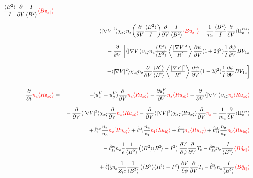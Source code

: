 \documentclass[11pt]{article}
\def\r#1{{\rm#1}}
\def\ave#1{\left\langle#1\right\rangle}
\def\aves#1{\langle#1\rangle}
\def\dd#1#2{\frac{\partial #1}{\partial #2}}
\def\para{\parallel}
\def\ddV{\frac{\partial}{\partial V}}
\def\ddt{\frac{\partial}{\partial t}}
\def\mz{m_\r{z}}
\def\nee{n_\r{e}}
\def\ni{n_\r{i}}
\def\nz{n_\r{z}}
\def\nb{n_\r{b}}
\def\Te{T_\r{e}}
\def\Ti{T_\r{i}}
\def\Zi{Z_\r{i}}
\def\uzt#1{u_{\r{#1}\zeta}}
\def\upara#1{u_{\r{#1}\para}}
\def\qhatpara#1{\hat{q}_{\r{#1}\para}}
\def\uV#1{u_\r{#1}^V}
\def\ugV{u_{g}^V}
\def\chis#1{\chi_\r{#1}}
\def\bri{\aves{B^2}\aves{R^2} - I^2}
\def\red#1{\textcolor{red}{#1}}
\begin{document}
\begin{eqnarray}
  \frac{\aves{B^2}}{I} \ddV \frac{I}{\aves{B^2}} \red{\aves{B \upara{z}}}
\nonumber\\[3mm]&&{}
%
  - \aves{|\nabla V|^2} \chis{z\zeta} \nz \biggl( \ddV
  \frac{\aves{B^2}}{I} \biggr) \ddV \frac{I}{\aves{B^2}} \red{\aves{B \upara{z}}}
%
  - \frac{1}{\mz} \frac{\aves{B^2}}{I} \ddV \aves{\Pi_\r{z}^\r{res}}
\nonumber\\[3mm]&&{}
%
  - \ddV
    \left[  \aves{|\nabla V|} v_{\r{z}\zeta} \nz
            \frac{\aves{R^2}}{\aves{B^2}}\ave{\frac{|\nabla V|^2}{R^2}}\dd{\psi}{V}(1+2\hat{q}^2)
	    \frac{1}{I} \dd{\psi}{V} BV_{1\r{z}} \right.
\nonumber\\[3mm]&&{}
    \left.- \aves{|\nabla V|^2} \chis{z\zeta} \nz
          \ddV \frac{\aves{R^2}}{\aves{B^2}}\ave{\frac{|\nabla V|^2}{R^2}}\dd{\psi}{V}(1+2\hat{q}^2)
	  \frac{1}{I} \dd{\psi}{V} BV_{1\r{z}}\right]
\\[5mm]
  \ddt \red{\nz \aves{R \uzt{z}}} &=&
%
  - (\uV{z} - \ugV) \ddV \red{\nz \aves{R \uzt{z}}}
%
  - \dd{\uV{z}}{V} \red{\nz \aves{R \uzt{z}}}
%
  - \ddV \aves{|\nabla V|} v_{\r{z}\zeta} \red{\nz \aves{R \uzt{z}}}
\nonumber\\[3mm]&&{}
  + \ddV \aves{|\nabla V|^2} \chis{z\zeta} \ddV \red{\nz \aves{R \uzt{z}}}
  - \ddV \aves{|\nabla V|^2} \chis{z\zeta} \aves{R \uzt{z}}\ddV \red{\nz} 
  - \frac{1}{\mz} \ddV \aves{\Pi_\r{z}^\r{res}}
\nonumber\\[2.5mm]&&{}
%
  + \hat{\ell}_{11}^\r{ze} \frac{\nz}{\nee} \red{\nee \aves{R \uzt{e}}}
  + \hat{\ell}_{11}^\r{zi} \frac{\nz}{\ni}  \red{\ni  \aves{R \uzt{i}}}
  + \hat{\ell}_{11}^\r{zz}                  \red{\nz  \aves{R \uzt{z}}}
  + \hat{\ell}_{11}^\r{zb} \frac{\nz}{\nb}  \red{\nb  \aves{R \uzt{b}}}
\nonumber\\[2.5mm]&&{}
%
  - \hat{\ell}_{12}^\r{ze} \nz \frac{1}{e} \frac{1}{\aves{B^2}} \left( \bri \right)
    \dd{V}{\psi} \ddV \Te
  - \hat{\ell}_{12}^\r{ze} \nz \frac{I}{\aves{B^2}} \red{\aves{B \qhatpara{e}}}
\nonumber\\[2.5mm]&&{}
  + \hat{\ell}_{12}^\r{zi} \nz \frac{1}{\Zi e} \frac{1}{\aves{B^2}} \left( \bri \right)
    \dd{V}{\psi} \ddV \Ti
  - \hat{\ell}_{12}^\r{zi} \nz \frac{I}{\aves{B^2}} \red{\aves{B \qhatpara{i}}}

\end{eqnarray}
\end{document}
